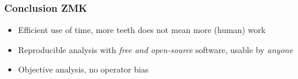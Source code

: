 
\begin{frame}
  \frametitle{Conclusion ZMK}
  \begin{itemize}
    \item Efficient use of time, \eg{} more teeth does not mean more (human) work
    \item Reproducible analysis with \emph{free and open-source} software, usable by \emph{anyone}
    \item Objective analysis, \eg{} no operator bias
  \end{itemize}
\end{frame}

